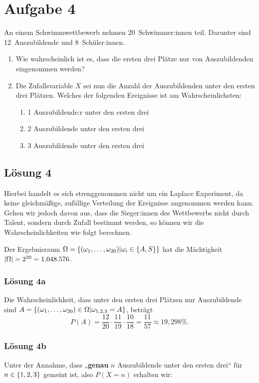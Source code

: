 \documentclass[main.tex]{subfiles}
\begin{document}
\section{Aufgabe 4}
An einem Schwimmwettbewerb nehmen 20~Schwimmer:innen teil. Darunter sind 12~Auszubildende und 8~Schüler:innen.
\begin{enumerate}
    \item Wie wahrscheinlich ist es, dass die ersten drei Plätze nur von Auszubildenden eingenommen werden?
    \item Die Zufallsvariable $X$ sei nun die \glqq Anzahl der Auszubildenden unter den ersten drei Plätzen\grqq. Welches der folgenden Ereignisse ist am Wahrscheinlichsten:
    \begin{enumerate}
        \item 1 Auszubildende:r unter den ersten drei
        \item 2 Auszubildende unter den ersten drei
        \item 3 Auszubildende unter den ersten drei
    \end{enumerate}
\end{enumerate}

\subsection{Lösung 4}
Hierbei handelt es sich strenggenommen nicht um ein Laplace Experiment, da  keine gleichmäßige, zufällige Verteilung der Ereignisse angenommen werden kann. Gehen wir jedoch davon aus, dass die Sieger:innen des Wettbewerbs nicht durch Talent, sondern durch Zufall bestimmt werden, so können wir die Wahrscheinlichkeiten wie folgt berechnen.

Der Ergebnisraum $\Omega = \set*{(\omega_1, \ldots, \omega_{20})\middle| \omega_i \in \set*{A, S} }$ hat die Mächtigkeit $\abs*{\Omega} = 2^{20} = 1.048.576$.

\subsubsection{Lösung 4a}
Die Wahrscheinlichkeit, dass unter den ersten drei Plätzen nur Auszubildende sind $A=\set*{(\omega_1, \ldots, \omega_{20}) \in \Omega \middle|\omega_{1,2,3} = A}$, beträgt
\begin{equation*}
    P(A) = \frac{12}{20} \cdot \frac{11}{19} \cdot \frac{10}{18} = \frac{11}{57} \approx 19,298\%.
\end{equation*}

\subsubsection{Lösung 4b}
Unter der Annahme, dass „\textbf{genau} $n$ Auszubildende unter den ersten drei“ für $n\in\set*{1,2,3}$ gemeint ist, also $P(X=n)$ erhalten wir:
\end{document}
